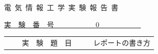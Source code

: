 \documentclass[autodetect-engine,dvipdfmx-if-dvi,ja=standard]{bxjsarticle}
\begin{document}
\thispagestyle{empty}
\vspace{1cm}
\begin{center}
    \fontsize{30pt}{0pt} \selectfont
    電~気~情~報~工~学~実~験~報~告~書
\end{center}
\vspace{1.4cm}
\begin{center}
    \underline{
        \fontsize{14pt}{0pt} \selectfont
        実~~験~~番~~号~~~~~~~~~~~
        \fontsize{18pt}{0pt} \selectfont
        0
        \fontsize{14pt}{0pt} \selectfont
        ~~~~~~~~~~~
    }
\end{center}
\vspace{0.4cm}
\begin{table}[h]
    \begin{center}
        \begin{tabular}{| c | l |} \hline
            \parbox[c][1.5cm][c]{0cm}{}
            ~~~~実~~験~~題~~目~~~~ &
            \parbox[c][1.5cm][c]{12cm}{
                \fontsize{14pt}{0pt} \selectfont
                レポートの書き方
            }
            \\ \hline
        \end{tabular}
    \end{center}
\end{table}
\end{document}
